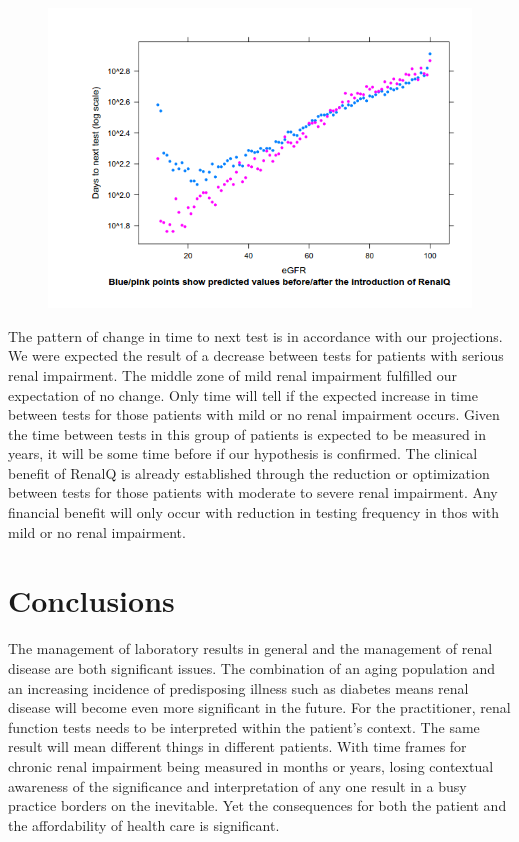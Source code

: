 \documentclass[11pt]{article}
\begin{document}
\begin{figure}[htp]
\centering
\includegraphics[scale=0.50]{FigCritical.png}
\caption{}
\label{}
\end{figure}

The pattern of change in time to next test is in accordance with our projections. We were expected the result of a decrease between tests for patients with serious renal impairment. The middle zone of mild renal impairment fulfilled our expectation of no change. Only time will tell if the expected increase in time between tests for those patients with mild or no renal impairment occurs. Given the time between tests in this group of patients is expected to be measured in years, it will be some time before if our hypothesis is confirmed. The clinical benefit of RenalQ is already established through the reduction or optimization between tests for those patients with moderate to severe renal impairment. Any financial benefit will only occur with reduction in testing frequency in thos with mild or no renal impairment.

\section{Conclusions}
The management of laboratory results in general and the management of renal disease are both significant issues. The combination of an aging population and an increasing incidence of predisposing illness such as diabetes means renal disease will become even more significant in the future. For the practitioner, renal function tests needs to be interpreted within the patient's context. The same result will mean different things in different patients. With time frames for chronic renal impairment being measured in months or years, losing contextual awareness of the significance and interpretation of any one result in a busy practice borders on the inevitable. Yet the consequences for both the patient and the affordability of health care is significant.\\
\end{document}
